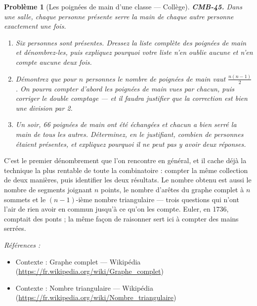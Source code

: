 \documentclass[11pt]{article}
\newtheorem{problem}{Problème}
\newenvironment{refs}{\par\small\noindent\emph{Références :}\begin{itemize}\setlength\itemsep{0pt}}{\end{itemize}\normalsize}
\begin{document}
\begin{problem}[{Les poignées de main d'une classe --- Collège}]
\textbf{CMB-45.} Dans une salle, chaque personne présente serre la main de chaque autre personne
exactement une fois.
\begin{enumerate}
\item[(a)] Six personnes sont présentes. Dressez la liste complète des poignées de main et dénombrez-les,
puis expliquez pourquoi votre liste n'en oublie aucune et n'en compte aucune deux fois.
\item[(b)] Démontrez que pour $ n $ personnes le nombre de poignées de main vaut $ \frac{n(n-1)}{2} $.
On pourra compter d'abord les poignées de main \og{} vues \fg{} par chacun, puis corriger le double
comptage --- et il faudra justifier que la correction est bien une division par 2.
\item[(c)] Un soir, 66 poignées de main ont été échangées et chacun a bien serré la main de tous les
autres. Déterminez, en le justifiant, combien de personnes étaient présentes, et expliquez pourquoi
il ne peut pas y avoir deux réponses.
\end{enumerate}

\end{problem}

\noindent C'est le premier dénombrement que l'on rencontre en général, et il cache déjà la
technique la plus rentable de toute la combinatoire : compter la même collection de deux manières,
puis identifier les deux résultats. Le nombre obtenu est aussi le nombre de segments joignant
$ n $ points, le nombre d'arêtes du graphe complet à $ n $ sommets et le $ (n-1) $-ième nombre
triangulaire --- trois questions qui n'ont l'air de rien avoir en commun jusqu'à ce qu'on les compte.
Euler, en 1736, comptait des ponts ; la même façon de raisonner sert ici à compter des mains
serrées.

\begin{refs}
\item Contexte : Graphe complet --- Wikipédia (\url{https://fr.wikipedia.org/wiki/Graphe_complet})
\item Contexte : Nombre triangulaire --- Wikipédia (\url{https://fr.wikipedia.org/wiki/Nombre_triangulaire})
\end{refs}

\bigskip
\end{document}
